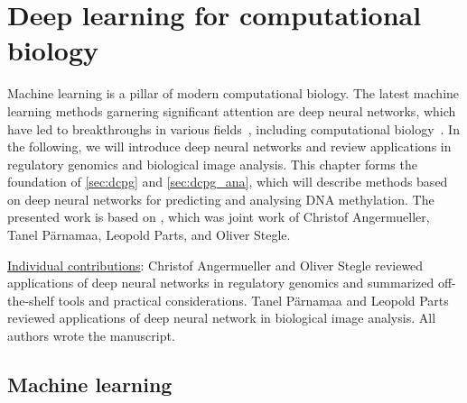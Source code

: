 

\chapter{Deep learning for computational biology} \label{sec:dl}

\ifpdf
    \graphicspath{{Chapter2/Figs/Raster/}{Chapter2/Figs/PDF/}{Chapter2/Figs/}}
\else
    \graphicspath{{Chapter2/Figs/Vector/}{Chapter2/Figs/}}
\fi

Machine learning is a pillar of modern computational biology. The latest machine learning methods garnering significant attention are deep neural networks, which have led to breakthroughs in various fields~\citep{lecun_deep_2015,schmidhuber_deep_2015,bengio_representation_2013}, including computational biology~\citep{alipanahi_predicting_2015,dahl_multi-task_2014,eickholt_dndisorder:_2013,kelley_basset:_2016,leung_deep_2014,sonderby_protein_2014,wang_chromatin_2015,zhou_predicting_2015}. In the following, we will introduce deep neural networks and review applications in regulatory genomics and biological image analysis. This chapter forms the foundation of \cref{sec:dcpg} and \cref{sec:dcpg_ana}, which will describe methods based on deep neural networks for predicting and analysing DNA methylation. The presented work is based on \citet{angermueller_deep_2016}, which was joint work of Christof Angermueller, Tanel P\"arnamaa, Leopold Parts, and Oliver Stegle.

\begin{center}
\begin{minipage}{.9\linewidth}
\underline{Individual contributions}: Christof Angermueller and Oliver Stegle reviewed applications of deep neural networks in regulatory genomics and summarized off-the-shelf tools and practical considerations. Tanel P\"arnamaa and Leopold Parts reviewed applications of deep neural network in biological image analysis. All authors wrote the manuscript.
\end{minipage}
\end{center}

\section{Machine learning}


